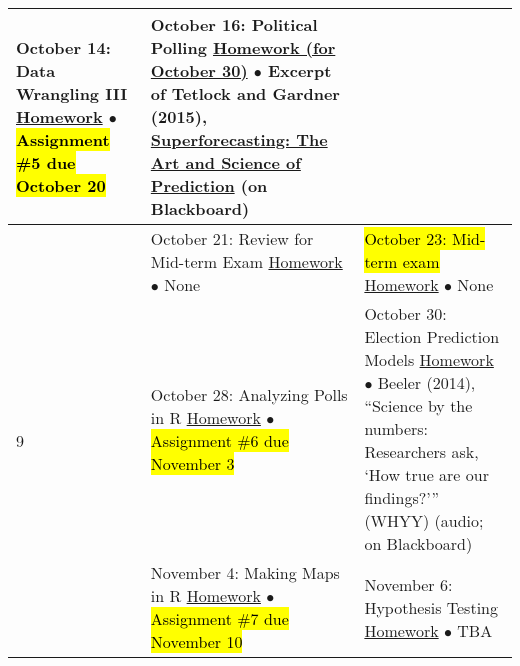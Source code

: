 \documentclass[12pt,letterpaper]{article}
\begin{document}
\begin{tabularx}{\textwidth}{|p{}|p{}||p{}|}
October 14: Data Wrangling III \newline \newline
\ul{Homework} \newline
$\bullet$ \hl{Assignment \#5 due October 20} &

October 16: Political Polling \newline \newline
\ul{Homework (for October 30)} \newline
$\bullet$ Excerpt of Tetlock and Gardner (2015), \ul{Superforecasting: The Art and Science of Prediction} (on Blackboard) \\


\hline
\multirow{6}{*}{9} &

October 21: Review for Mid-term Exam \newline \newline
\ul{Homework} \newline
$\bullet$ None &

\hl{October 23: Mid-term exam} \newline \newline
\ul{Homework} \newline
$\bullet$ None \\


\hline
\multirow{6}{*}{10} &

October 28: Analyzing Polls in R \newline \newline
\ul{Homework} \newline
$\bullet$ \hl{Assignment \#6 due November 3} &

October 30: Election Prediction Models \newline \newline
\ul{Homework} \newline
$\bullet$ Beeler (2014), ``Science by the numbers: Researchers ask, `How true are our findings?''' (WHYY) (audio; on Blackboard) \\


\hline
\multirow{6}{*}{11} &

November 4: Making Maps in R \newline \newline
\ul{Homework} \newline
$\bullet$ \hl{Assignment \#7 due November 10}  &

November 6: Hypothesis Testing \newline \newline
\ul{Homework} \newline
$\bullet$ TBA \\


\end{tabularx}
\end{document}
